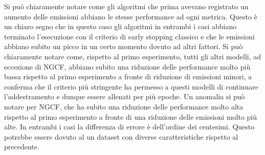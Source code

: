 \noindent Si può chiaramente notare come gli algoritmi che prima avevano registrato un aumento delle emissioni abbiano le stesse performance ad ogni metrica.
Questo è un chiaro segno che in questo caso gli algoritmi in entrambi i casi abbiano terminato l'esecuzione con il criterio di early stopping classico e che le emissioni abbiano subito un picco in un certo momento dovuto ad altri fattori.
Si può chiaramente notare come, rispetto al primo esperimento, tutti gli altri modelli, ad eccezione di NGCF, abbiano subito una riduzione delle performance molto più bassa rispetto al primo esperimento a fronte di riduzione di emissioni minori, a conferma che il criterio più stringente ha permesso a questi modelli di continuare l'addestramento e dunque essere allenati per più epoche.
Un anomalia si può notare per NGCF, che ha subito una riduzione delle performance molto alta rispetto al primo esperimento a fronte di una riduzione delle emissioni molto più alte. In entrambi i casi la differenza di errore è dell'ordine dei centesimi. Questo potrebbe essere dovuto al un dataset con diverse caratteristiche rispetto al precedente.

